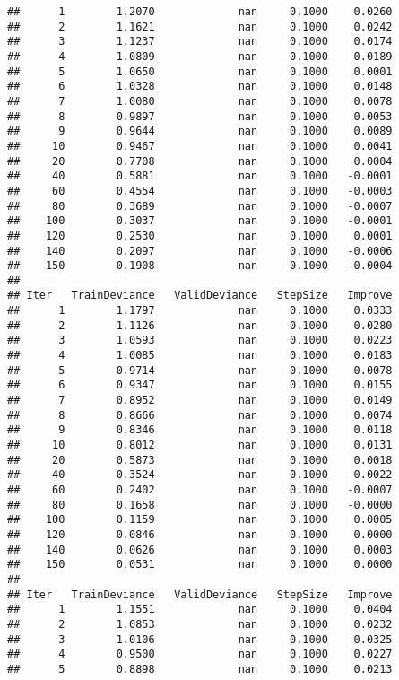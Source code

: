 \documentclass[]{article}
\begin{document}
\begin{verbatim}
##      1        1.2070             nan     0.1000    0.0260
##      2        1.1621             nan     0.1000    0.0242
##      3        1.1237             nan     0.1000    0.0174
##      4        1.0809             nan     0.1000    0.0189
##      5        1.0650             nan     0.1000    0.0001
##      6        1.0328             nan     0.1000    0.0148
##      7        1.0080             nan     0.1000    0.0078
##      8        0.9897             nan     0.1000    0.0053
##      9        0.9644             nan     0.1000    0.0089
##     10        0.9467             nan     0.1000    0.0041
##     20        0.7708             nan     0.1000    0.0004
##     40        0.5881             nan     0.1000   -0.0001
##     60        0.4554             nan     0.1000   -0.0003
##     80        0.3689             nan     0.1000   -0.0007
##    100        0.3037             nan     0.1000   -0.0001
##    120        0.2530             nan     0.1000    0.0001
##    140        0.2097             nan     0.1000   -0.0006
##    150        0.1908             nan     0.1000   -0.0004
## 
## Iter   TrainDeviance   ValidDeviance   StepSize   Improve
##      1        1.1797             nan     0.1000    0.0333
##      2        1.1126             nan     0.1000    0.0280
##      3        1.0593             nan     0.1000    0.0223
##      4        1.0085             nan     0.1000    0.0183
##      5        0.9714             nan     0.1000    0.0078
##      6        0.9347             nan     0.1000    0.0155
##      7        0.8952             nan     0.1000    0.0149
##      8        0.8666             nan     0.1000    0.0074
##      9        0.8346             nan     0.1000    0.0118
##     10        0.8012             nan     0.1000    0.0131
##     20        0.5873             nan     0.1000    0.0018
##     40        0.3524             nan     0.1000    0.0022
##     60        0.2402             nan     0.1000   -0.0007
##     80        0.1658             nan     0.1000   -0.0000
##    100        0.1159             nan     0.1000    0.0005
##    120        0.0846             nan     0.1000    0.0000
##    140        0.0626             nan     0.1000    0.0003
##    150        0.0531             nan     0.1000    0.0000
## 
## Iter   TrainDeviance   ValidDeviance   StepSize   Improve
##      1        1.1551             nan     0.1000    0.0404
##      2        1.0853             nan     0.1000    0.0232
##      3        1.0106             nan     0.1000    0.0325
##      4        0.9500             nan     0.1000    0.0227
##      5        0.8898             nan     0.1000    0.0213

\end{verbatim}
\end{document}
